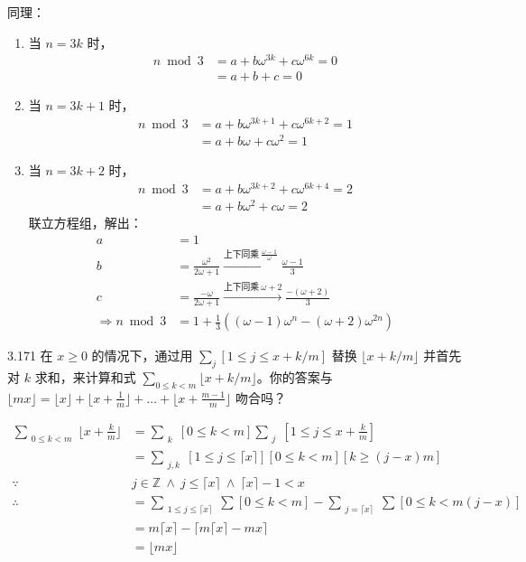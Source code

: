 同理：
\begin{enumerate}
  \item 当 \( n = 3k \) 时，
    \begin{align*}
      n \bmod 3 & = a + b \omega^{3k} + c \omega^{6k} = 0 \\
      & = a + b + c = 0
    \end{align*}
  \item 当 \( n = 3k+1 \) 时，
    \begin{align*}
      n \bmod 3 & = a + b \omega^{3k+1} + c \omega^{6k+2} = 1 \\
      & = a + b \omega + c \omega^2 = 1
    \end{align*}
  \item 当 \( n = 3k+2 \) 时，
    \begin{align*}
      n \bmod 3 & = a + b \omega^{3k+2} + c \omega^{6k+4} = 2 \\
      & = a + b \omega^2 + c \omega = 2
    \end{align*}
    联立方程组，解出：
    \begin{align*}
      a & = 1 \\
      b & = \frac{\omega^2}{2\omega + 1} \xrightarrow{\text{上下同乘} \ \frac{\omega - 1}{\omega}} \frac{\omega - 1}{3} \\
      c &= \frac{- \omega}{2 \omega + 1} \xrightarrow{\text{上下同乘} \ \omega + 2} \frac{-(\omega + 2)}{3} \\
      \Rightarrow n \bmod 3 & = 1 + \frac{1}{3} ((\omega - 1) \omega^n - (\omega + 2) \omega^{2n})
    \end{align*}
\end{enumerate}

\begin{problem}{3.17}{1}
  在 \( x \ge 0 \) 的情况下，通过用 \( \sum_{j} [1 \le j \le x + k/m] \) 替换 \( \lfloor x + k/m \rfloor \) 并首先对 \( k \) 求和，来计算和式 \( \sum_{0 \le k < m} \lfloor x + k/m \rfloor \)。你的答案与 \( \lfloor mx \rfloor = \lfloor x \rfloor + \lfloor x + \frac{1}{m} \rfloor + \dots + \lfloor x + \frac{m-1}{m} \rfloor \) 吻合吗？
\end{problem}

\begin{align*}
  \sum_{\substack{0 \le k < m}} \lfloor x + \frac{k}{m} \rfloor & = \sum_{\substack{k}} [ 0 \le k < m] \sum_{\substack{j}} [1 \le j \le x + \frac{k}{m}] \\
  & = \sum_{\substack{j,k}}[1 \le j \le \lceil x \rceil] [0 \le k < m][k \ge (j-x)m] \\
  \because \ & j \in \mathbb{Z} \ \land \ j \le \lceil x \rceil \ \land \ \lceil x \rceil -1 < x \\
  \therefore \ & = \sum_{\substack{1 \le j \le \lceil x \rceil}} \sum [0 \le k < m] - \sum_{\substack{j = \lceil x \rceil}} \sum [0 \le k < m(j-x)] \\
  & = m \lceil x \rceil - \lceil m \lceil x \rceil - mx \rceil \\
  & = \lfloor mx \rfloor
\end{align*}

